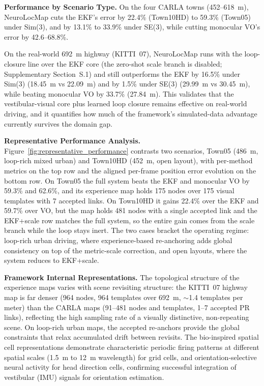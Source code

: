 \textbf{Performance by Scenario Type.} On the four CARLA towns (452--618~m), NeuroLocMap cuts the EKF's error by 22.4\% (Town10HD) to 59.3\% (Town05) under Sim(3), and by 13.1\% to 33.9\% under SE(3), while cutting monocular VO's error by 42.6--68.8\%.

On the real-world 692~m highway (KITTI~07), NeuroLocMap runs with the loop-closure line over the EKF core (the zero-shot scale branch is disabled; Supplementary Section~S.1) and still outperforms the EKF by 16.5\% under Sim(3) (18.45~m vs 22.09~m) and by 1.5\% under SE(3) (29.99~m vs 30.45~m), while beating monocular VO by 33.7\% (27.84~m). This validates that the vestibular-visual core plus learned loop closure remains effective on real-world driving, and it quantifies how much of the framework's simulated-data advantage currently survives the domain gap.

\textbf{Representative Performance Analysis.} Figure~\ref{fig:representative_performance} contrasts two scenarios, Town05 (486~m, loop-rich mixed urban) and Town10HD (452~m, open layout), with per-method metrics on the top row and the aligned per-frame position error evolution on the bottom row. On Town05 the full system beats the EKF and monocular VO by 59.3\% and 62.6\%, and its experience map holds 175 nodes over 175 visual templates with 7 accepted links. On Town10HD it gains 22.4\% over the EKF and 59.7\% over VO, but the map holds 481 nodes with a single accepted link and the EKF+scale row matches the full system, so the entire gain comes from the scale branch while the loop stays inert. The two cases bracket the operating regime: loop-rich urban driving, where experience-based re-anchoring adds global consistency on top of the metric-scale correction, and open layouts, where the system reduces to EKF+scale.

\textbf{Framework Internal Representations.} The topological structure of the experience maps varies with scene revisiting structure: the KITTI~07 highway map is far denser (964 nodes, 964 templates over 692~m, $\sim$1.4 templates per meter) than the CARLA maps (91--481 nodes and templates, 1--7 accepted PR links), reflecting the high sampling rate of a visually distinctive, non-repeating scene. On loop-rich urban maps, the accepted re-anchors provide the global constraints that relax accumulated drift between revisits. The bio-inspired spatial cell representations demonstrate characteristic periodic firing patterns at different spatial scales (1.5~m to 12~m wavelength) for grid cells, and orientation-selective neural activity for head direction cells, confirming successful integration of ves\-tib\-u\-lar (IMU) signals for orientation estimation.

